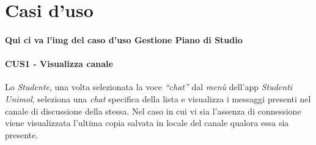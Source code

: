 \section{Casi d'uso}

\paragraph{Qui ci va l'img del caso d'uso Gestione Piano di Studio}
\label{diag:gestionePianoStudio}

\paragraph{CUS1 - Visualizza canale}
Lo \emph{Studente}, una volta selezionata la voce \emph{“chat”} dal \emph{menù} dell’app \emph{Studenti Unimol},  seleziona una \emph{chat} specifica della lista e visualizza i messaggi presenti nel canale di discussione della stessa. Nel caso in cui vi sia l’assenza di connessione viene visualizzata l’ultima copia salvata in locale del canale qualora essa sia presente.
